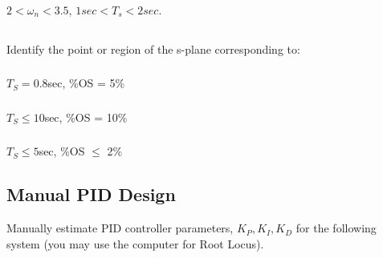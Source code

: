 \documentclass{article}	%
\begin{document}



\subsubsection{} $2<\omega_n<3.5$, $1sec < T_s < 2sec$.







\subsection{}  Identify the point or region of the s-plane corresponding to:

\subsubsection{}    $T_S = 0.8$sec, \%OS = 5\%

\subsubsection{}    $T_S \leq 10$sec, \%OS = 10\%

\subsubsection{}    $T_S \leq 5$sec, \%OS $\leq$ 2\%


%
%
%





\subsection{Manual PID Design}\label{manualdesign1}


Manually estimate PID controller parameters, $K_P, K_I, K_D$ for the following system (you may use the computer for Root Locus).
\end{document}
